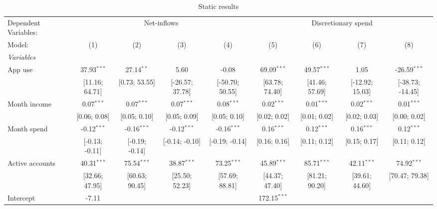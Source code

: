 
\begin{table}[htbp]
   \centering
   \tiny
   \begin{threeparttable}[b]
      \caption{\label{tab:static} Static results}
      \begin{tabular}{lcccccccc}
         \tabularnewline \midrule \midrule
         Dependent Variables: & \multicolumn{4}{c}{Net-inflows} & \multicolumn{4}{c}{Discretionary spend}\\
         Model:          & (1)             & (2)            & (3)             & (4)             & (5)              & (6)            & (7)             & (8)\\  
         \midrule
         \emph{Variables}\\
         App use         & 37.93$^{***}$   & 27.14$^{**}$   & 5.60            & -0.08           & 69.09$^{***}$    & 49.57$^{***}$  & 1.05            & -26.59$^{***}$\\   
                         & [11.16; 64.71]  & [0.73; 53.55]  & [-26.57; 37.78] & [-50.70; 50.55] & [63.78; 74.40]   & [41.46; 57.69] & [-12.92; 15.03] & [-38.73; -14.45]\\   
         Month income    & 0.07$^{***}$    & 0.07$^{***}$   & 0.07$^{***}$    & 0.08$^{***}$    & 0.02$^{***}$     & 0.01$^{***}$   & 0.02$^{***}$    & 0.01$^{***}$\\   
                         & [0.06; 0.08]    & [0.05; 0.10]   & [0.05; 0.09]    & [0.05; 0.10]    & [0.02; 0.02]     & [0.01; 0.02]   & [0.02; 0.03]    & [0.00; 0.02]\\   
         Month spend     & -0.12$^{***}$   & -0.16$^{***}$  & -0.12$^{***}$   & -0.16$^{***}$   & 0.16$^{***}$     & 0.12$^{***}$   & 0.16$^{***}$    & 0.12$^{***}$\\   
                         & [-0.13; -0.11]  & [-0.19; -0.14] & [-0.14; -0.10]  & [-0.19; -0.14]  & [0.16; 0.16]     & [0.11; 0.12]   & [0.15; 0.17]    & [0.11; 0.12]\\   
         Active accounts & 40.31$^{***}$   & 75.54$^{***}$  & 38.87$^{***}$   & 73.25$^{***}$   & 45.89$^{***}$    & 85.71$^{***}$  & 42.11$^{***}$   & 74.92$^{***}$\\   
                         & [32.66; 47.95]  & [60.63; 90.45] & [25.50; 52.23]  & [57.69; 88.81]  & [44.37; 47.40]   & [81.21; 90.20] & [39.61; 44.60]  & [70.47; 79.38]\\   
         Intercept       & -7.11           &                &                 &                 & 172.15$^{***}$   &                &                 &   \\   

\end{tabular}
\end{threeparttable}
\end{table}
